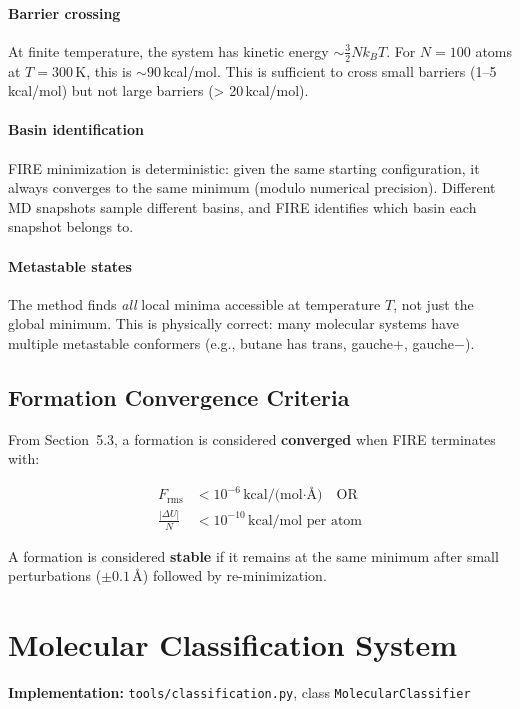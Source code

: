 \documentclass[11pt]{article}
\begin{document}
\paragraph{Barrier crossing} At finite temperature, the system has kinetic energy $\sim \frac{3}{2}Nk_BT$. For $N = 100$ atoms at $T = 300$\,K, this is $\sim 90$\,kcal/mol. This is sufficient to cross small barriers (1--5\,kcal/mol) but not large barriers (> 20\,kcal/mol).

\paragraph{Basin identification} FIRE minimization is deterministic: given the same starting configuration, it always converges to the same minimum (modulo numerical precision). Different MD snapshots sample different basins, and FIRE identifies which basin each snapshot belongs to.

\paragraph{Metastable states} The method finds \textit{all} local minima accessible at temperature $T$, not just the global minimum. This is physically correct: many molecular systems have multiple metastable conformers (e.g., butane has trans, gauche+, gauche$-$).

\subsection{Formation Convergence Criteria}

From Section~5.3, a formation is considered \textbf{converged} when FIRE terminates with:

\begin{align}
F_{\text{rms}} &< 10^{-6}\,\text{kcal/(mol·\AA)} \quad \text{OR} \\
\frac{|\Delta U|}{N} &< 10^{-10}\,\text{kcal/mol per atom}
\end{align}

A formation is considered \textbf{stable} if it remains at the same minimum after small perturbations ($ \pm 0.1$\,\AA) followed by re-minimization.

\section{Molecular Classification System}

\textbf{Implementation:} \texttt{tools/classification.py}, class \texttt{MolecularClassifier}
\end{document}
